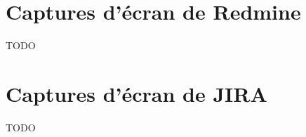 \appendix

\chapter{Captures d'écran de Redmine}
\label{annexe:redmine}

TODO


\chapter{Captures d'écran de JIRA}
\label{annexe:jira}

TODO

